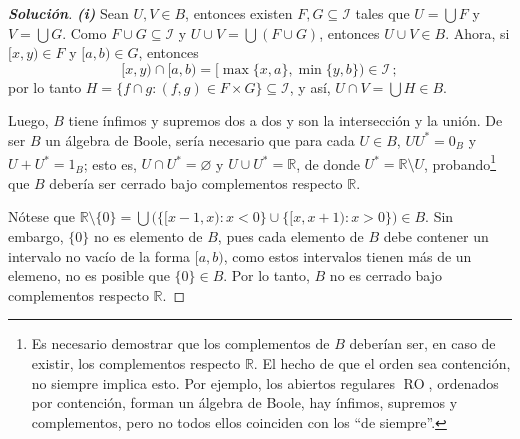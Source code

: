 \documentclass[letterpaper,DIV=15,12pt]{scrartcl}
\renewcommand{\qedsymbol}{$\blacksquare$}
\newenvironment{solucion}{\renewcommand{\qedsymbol}{$\boxtimes$}\begin{proof}[\normalfont\bfseries Solución]}{\end{proof}}
\renewcommand{\emptyset}{\varnothing}
\newcommand{\tq}{:}
\begin{document}
    \begin{solucion}\textit{\textbf{(i)}}
    Sean $U,V \in B$, entonces existen $F,G \subseteq \mathscr{I}$ tales que $U=\bigcup F$ y $V=\bigcup G$. Como $F \cup G \subseteq \mathscr{I}$ y $U \cup V = \bigcup (F \cup G)$, entonces $U \cup V \in B$. Ahora, si $[x,y) \in F$ y $[a,b) \in G$, entonces
    \[ [x,y) \cap [a,b) = [\max\{x,a\}, \min\{y,b\}) \in \mathscr{I} \, ; \]
    por lo tanto $H = \{ f \cap g \tq (f,g) \in F \times G \} \subseteq \mathscr{I}$, y así, $U \cap V = \bigcup H \in B$.

    Luego, $B$ tiene ínfimos y supremos dos a dos y son la intersección y la unión. De ser $B$ un álgebra de Boole, sería necesario que para cada $U \in B$, $U U^* = 0_B$ y $U + U^*=1_B$; esto es, $U \cap U^* = \emptyset$ y $U \cup U^* = \mathbb{R}$, de donde $U^* = \mathbb{R} \setminus U$, probando\footnote{Es necesario demostrar que los complementos de $B$ deberían ser, en caso de existir, los complementos respecto $\mathbb{R}$. El hecho de que el orden sea contención, no siempre implica esto. Por ejemplo, los abiertos regulares $\operatorname*{RO}$, ordenados por contención, forman un álgebra de Boole, hay ínfimos, supremos y complementos, pero no todos ellos coinciden con los ``de siempre''.} que $B$ debería ser cerrado bajo complementos respecto $\mathbb{R}$.

    Nótese que $\mathbb{R} \setminus \{0\} = \bigcup \big( \big\{ [x-1,x) \tq x < 0 \big\} \cup \big\{ [x,x+1) \tq x > 0 \big\} \big) \in B$. Sin embargo, $\{ 0 \}$ no es elemento de $B$, pues cada elemento de $B$ debe contener un intervalo no vacío de la forma $[a,b)$, como estos intervalos tienen más de un elemeno, no es posible que $\{0\} \in B$. Por lo tanto, $B$ no es cerrado bajo complementos respecto $\mathbb{R}$.
    \end{solucion}
\end{document}
